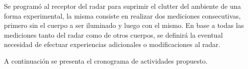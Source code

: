 Se programó al receptor del radar para suprimir el clutter del ambiente de una forma experimental, la misma consiste en realizar dos mediciones consecutivas, primero sin el cuerpo a ser iluminado y luego con el mismo. En base a todas las mediciones tanto del radar como de otros cuerpos, se definirá la eventual necesidad de efectuar experiencias adicionales o modificaciones al radar.

A continuación se presenta el cronograma de actividades propuesto.

